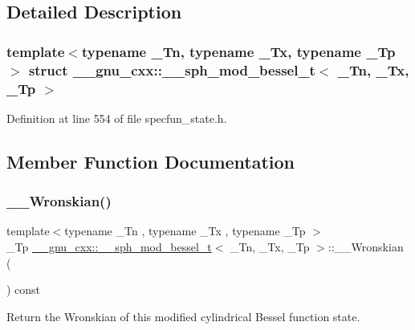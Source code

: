 \subsection{Detailed Description}
\subsubsection*{template$<$typename \+\_\+\+Tn, typename \+\_\+\+Tx, typename \+\_\+\+Tp$>$\newline
struct \+\_\+\+\_\+gnu\+\_\+cxx\+::\+\_\+\+\_\+sph\+\_\+mod\+\_\+bessel\+\_\+t$<$ \+\_\+\+Tn, \+\_\+\+Tx, \+\_\+\+Tp $>$}



Definition at line 554 of file specfun\+\_\+state.\+h.



\subsection{Member Function Documentation}
\mbox{\label{struct____gnu__cxx_1_1____sph__mod__bessel__t_afbe229c1b0faafc786c78eee38e52d0a}} 
\subsubsection{\texorpdfstring{\+\_\+\+\_\+\+Wronskian()}{\_\_Wronskian()}}
{\footnotesize\ttfamily template$<$typename \+\_\+\+Tn , typename \+\_\+\+Tx , typename \+\_\+\+Tp $>$ \\
\+\_\+\+Tp \hyperlink{struct____gnu__cxx_1_1____sph__mod__bessel__t}{\+\_\+\+\_\+gnu\+\_\+cxx\+::\+\_\+\+\_\+sph\+\_\+mod\+\_\+bessel\+\_\+t}$<$ \+\_\+\+Tn, \+\_\+\+Tx, \+\_\+\+Tp $>$\+::\+\_\+\+\_\+\+Wronskian (\begin{DoxyParamCaption}{ }\end{DoxyParamCaption}) const\hspace{0.3cm}{\ttfamily [inline]}}



Return the Wronskian of this modified cylindrical Bessel function state. 



